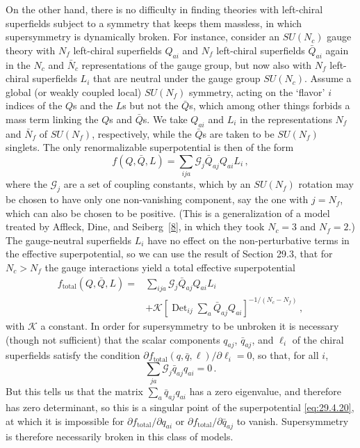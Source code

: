 On the other hand, there is no difficulty in finding theories with
left-chiral superfields subject to a symmetry that keeps them massless, in
which supersymmetry is dynamically broken. For instance, consider an
\(SU(N_c)\) gauge theory with \(N_f\) left-chiral superfields \(Q_{ai}\)
and \(N_f\) left-chiral superfields \(\bar Q_{ai}\) again in the \(N_c\)
and \(\bar N_c\) representations of the gauge group, but now also with
\(N_f\) left-chiral superfields \(L_i\) that are neutral under the gauge
group \(SU(N_c)\). Assume a global (or weakly coupled local) \(SU(N_f)\)
symmetry, acting on the `flavor' \(i\) indices of the \(Q\)s and the \(L\)s
but not the \(\bar Q\)s, which among other things forbids a mass term
linking the \(Q\)s and \(\bar Q\)s. We take \(Q_{ai}\) and \(L_i\) in the
representations \(N_f\) and \(\bar N_f\) of \(SU(N_f)\), respectively,
while the \(\bar Q\)s are taken to be \(SU(N_f)\) singlets. The only
renormalizable superpotential is then of the form
\begin{equation}
  f(Q,\bar Q,L)
  =
  \sum_{ija}\mathcal{G}_j\bar Q_{aj}Q_{ai}L_i\,,
  \tag{29.4.19}\label{eq:29.4.19}
\end{equation}
where the \(\mathcal{G}_j\) are a set of coupling constants, which by an
\(SU(N_f)\) rotation may be chosen to have only one non-vanishing
component, say the one with \(j=N_f\), which can also be chosen to be
positive. (This is a generalization of a model treated by Affleck, Dine,
and Seiberg~\hyperref[ch29-ref-8]{[8]}, in which they took \(N_c=3\) and
\(N_f=2\).) The gauge-neutral superfields \(L_i\) have no effect on the
non-perturbative terms in the effective superpotential, so we can use the
result of Section 29.3, that for \(N_c>N_f\) the gauge interactions yield a
total effective superpotential
\begin{equation}
  \begin{aligned}
  f_{\mathrm{total}}(Q,\bar Q,L)
  ={}&
  \sum_{ija}\mathcal{G}_j\bar Q_{aj}Q_{ai}L_i
  \\
  &+\mathcal{K}
  \left[
    \operatorname{Det}_{ij}\sum_a\bar Q_{aj}Q_{ai}
  \right]^{-1/(N_c-N_f)}
  \,,
  \end{aligned}
  \tag{29.4.20}\label{eq:29.4.20}
\end{equation}
with \(\mathcal{K}\) a constant. In order for supersymmetry to be unbroken
it is necessary (though not sufficient) that the scalar components
\(q_{aj}\), \(\bar q_{aj}\), and \(\ell_i\) of the chiral superfields
satisfy the condition
\(\partial f_{\mathrm{total}}(q,\bar q,\ell)/\partial\ell_i=0\), so that,
for all \(i\),
\begin{equation}
  \sum_{ja}\mathcal{G}_j\bar q_{aj}q_{ai}=0\,.
  \tag{29.4.21}\label{eq:29.4.21}
\end{equation}
But this tells us that the matrix \(\sum_a\bar q_{aj}q_{ai}\) has a zero
eigenvalue, and therefore has zero determinant, so this is a singular point
of the superpotential \eqref{eq:29.4.20}, at which it is impossible for
\(\partial f_{\mathrm{total}}/\partial q_{ai}\) or
\(\partial f_{\mathrm{total}}/\partial\bar q_{aj}\) to vanish.
Supersymmetry is therefore necessarily broken in this class of models.

